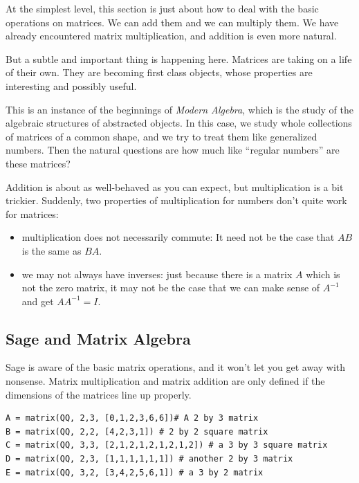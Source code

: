 \documentclass[10pt,]{book}
\theoremstyle{plain}
\numberwithin{equation}{section}
\begin{document}
      At the simplest level, this section is just about how to deal with the
      basic operations on matrices. We can add them and we can multiply them.
      We have already encountered matrix multiplication, and addition is even
      more natural.
\par

      But a subtle and important thing is happening here. Matrices are taking
      on a life of their own. They are becoming first class objects, whose
      properties are interesting and possibly useful.
\par

      This is an instance of the beginnings of \emph{Modern Algebra}, which
      is the study of the algebraic structures of abstracted objects. In this
      case, we study whole collections of matrices of a common shape, and we
      try to treat them like generalized numbers. Then the natural questions
      are how much like ``regular numbers'' are these matrices?
\par

      Addition is about as well-behaved as you can expect, but multiplication
      is a bit trickier. Suddenly, two properties of multiplication for numbers
      don't quite work for matrices:
\begin{itemize}
\item{}multiplication does not necessarily commute: It need not be the case
        that \(AB\) is the same as \(BA\).
      \item{}we may not always have inverses: just because there is a
        matrix \(A\) which is not the zero matrix, it may not be the case
        that we can make sense of \(A^{-1}\) and get \(AA^{-1} = I\).
      \end{itemize}
\typeout{************************************************}
\typeout{************************************************}
\subsection[Sage and Matrix Algebra]{Sage and Matrix Algebra}\label{subsection-39}

      Sage is aware of the basic matrix operations, and it won't let you get
      away with nonsense. Matrix multiplication and matrix addition are only
      defined if the dimensions of the matrices line up properly.
\begin{lstlisting}[style=sageinput]
A = matrix(QQ, 2,3, [0,1,2,3,6,6])# A 2 by 3 matrix
B = matrix(QQ, 2,2, [4,2,3,1]) # 2 by 2 square matrix
C = matrix(QQ, 3,3, [2,1,2,1,2,1,2,1,2]) # a 3 by 3 square matrix
D = matrix(QQ, 2,3, [1,1,1,1,1,1]) # another 2 by 3 matrix
E = matrix(QQ, 3,2, [3,4,2,5,6,1]) # a 3 by 2 matrix
\end{lstlisting}
\par
\end{document}
